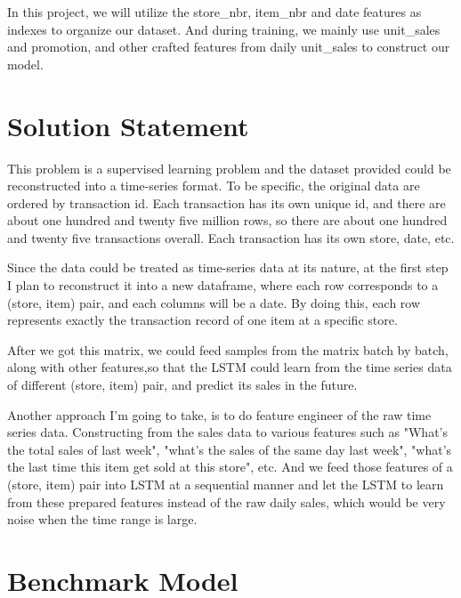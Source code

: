 \documentclass{article}
\begin{document}
In this project, we will utilize the store\_nbr, item\_nbr and date features as indexes to organize our dataset. And during training, we mainly use unit\_sales and promotion, and other crafted features from daily unit\_sales to construct our model. 


\section{Solution Statement}

This problem is a supervised learning problem and the dataset provided could be reconstructed into a time-series format. To be specific, the original data are ordered by transaction id. Each transaction has its own unique id, and there are about one hundred and twenty five million rows, so there are about one hundred and twenty five transactions overall. Each transaction has its own store, date, etc. 

Since the data could be treated as time-series data at its nature, at the first step I plan to reconstruct it into a new dataframe, where each row corresponds to a (store, item) pair, and each columns will be a date. By doing this, each row represents exactly the transaction record of one item at a specific store.

After we got this matrix, we could feed samples from the matrix batch by batch, along with other features,so that the LSTM could learn from the time series data of different (store, item) pair, and predict its sales in the future. 

Another approach I'm going to take, is to do feature engineer of the raw time series data. Constructing from the sales data to various features such as "What's the total sales of last week", "what's the sales of the same day last week", "what's the last time this item get sold at this store", etc. And we feed those features of a (store, item) pair into LSTM at a sequential manner and let the LSTM to learn from these prepared features instead of the raw daily sales, which would be very noise when the time range is large.  


\section{Benchmark Model}
\label{sec:benchmark}
\newcommand{\urlstarter}{https://www.kaggle.com/senkin13/lstm-starter}
\end{document}
